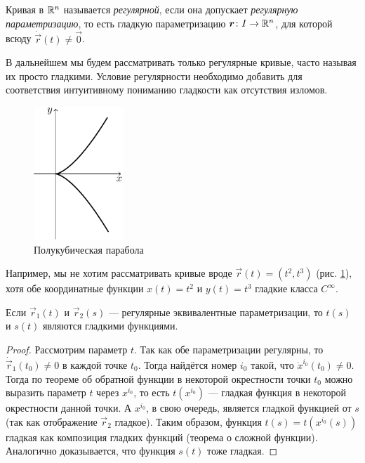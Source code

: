 \begin{definition}
	Кривая в $\mathbb{R}^n$ называется \textit{регулярной}, если она допускает \textit{регулярную параметризацию}, то есть гладкую параметризацию $\boldsymbol{r}\colon I \to \mathbb{R}^n$, для которой всюду $\dot{\vec{r}}(t) \ne \vec{0}$.
\end{definition}

В дальнейшем мы будем рассматривать только регулярные кривые, часто называя их просто гладкими. Условие регулярности необходимо добавить для соответствия интуитивному пониманию гладкости как отсутствия изломов.
\begin{figure}[h]
	\centering
	\includegraphics[height=5cm]{./img/SemicubicalParabola.pdf}
	\caption{Полукубическая парабола}
	\label{fig:SemicubicalParabola}
\end{figure}
Например, мы не хотим рассматривать кривые вроде $\vec{r}(t) = (t^2, t^3)$ (рис. \ref{fig:SemicubicalParabola}), хотя обе координатные функции $x(t) = t^2$ и $y(t) = t^3$ гладкие класса $C^\infty$.

\begin{proposition} \label{proposition:SmoothHomeomorphism}
	Если $\vec{r}_1(t)$ и $\vec{r}_2(s)$ --- регулярные эквивалентные параметризации, то $t(s)$ и $s(t)$ являются гладкими функциями.
\end{proposition}

\begin{proof}
	Рассмотрим параметр $t$. Так как обе параметризации регулярны, то $\dot{\vec{r}}_1(t_0) \ne 0$ в каждой точке $t_0$. Тогда найдётся номер $i_0$ такой, что $\dot{x}^{i_0}(t_0) \ne 0$. Тогда по теореме об обратной функции в некоторой окрестности точки $t_0$ можно выразить параметр $t$ через $x^{i_0}$, то есть $t(x^{i_0})$ --- гладкая функция в некоторой окрестности данной точки. А $x^{i_0}$, в свою очередь, является гладкой функцией от $s$ (так как отображение $\vec{r}_2$ гладкое). Таким образом, функция $t(s) = t(x^{i_0}(s))$ гладкая как композиция гладких функций (теорема о сложной функции). Аналогично доказывается, что функция $s(t)$ тоже гладкая.
\end{proof}

